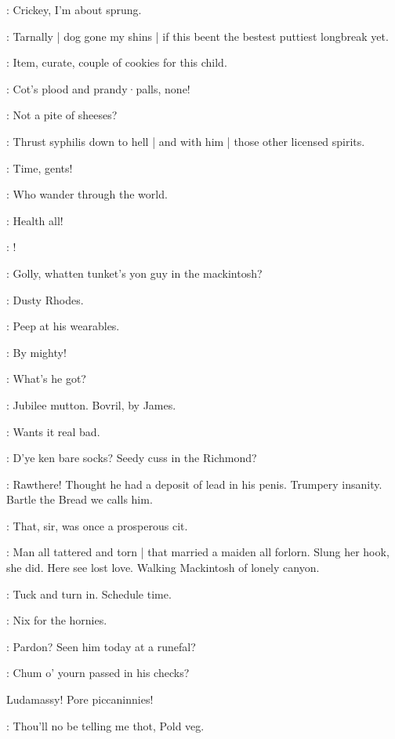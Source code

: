 \lynch:
Crickey,
I'm about sprung.

\lenehan:
Tarnally |
dog gone my shins |
if this beent the bestest puttiest longbreak yet.

\punch:
Item,
curate,
couple of cookies for this child.

\dixon:
Cot's plood and prandy·palls,
none!

\lynch:
Not a pite of sheeses?

\stephen:
Thrust syphilis down to hell |
and with him |
those other licensed spirits.

\barman:
Time,
gents!

\stephen:
Who wander through the world.

\punch:
Health all!

\dixon:
!


\crotthers:
Golly,
whatten tunket's yon guy in the mackintosh?

\lenehan:
Dusty Rhodes.

\lynch:
Peep at his wearables.

\crotthers:
By mighty!

\stephen:
What's he got?

\dixon:
Jubilee mutton.
Bovril,
by James.

\lenehan:
Wants it real bad.

\crotthers:
D'ye ken bare socks?
Seedy cuss in the Richmond?

\dixon:
Rawthere!
Thought he had a deposit of lead in his penis.
Trumpery insanity.
Bartle the Bread we calls him.

\lynch:
That,
sir,
was once a prosperous cit.

\Bloom:
Man all tattered and torn |
that married a maiden all forlorn.
Slung her hook,
she did.
Here see lost love.
Walking Mackintosh of lonely canyon.

\stephen:
Tuck and turn in.
Schedule time.

\lenehan:
Nix for the hornies.

\Bloom:
Pardon?
Seen him today at a runefal?

\lenehan:
Chum o' yourn passed in his checks?

\begin{omitted}
Ludamassy!
Pore piccaninnies!
\end{omitted}

\crotthers:
Thou'll no be telling me thot,
Pold veg.

